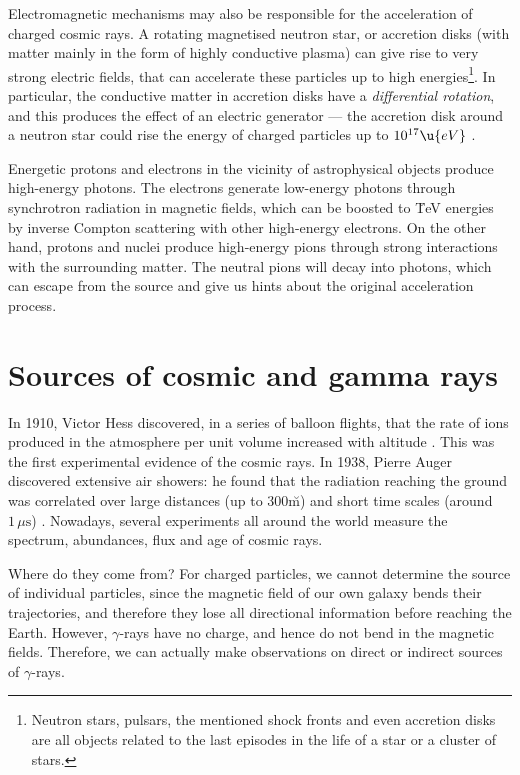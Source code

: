 Electromagnetic mechanisms may also be responsible for the
acceleration of charged cosmic rays.  A rotating magnetised neutron
star, or accretion disks (with matter mainly in the form of highly
conductive plasma) can give rise to very strong electric fields, that
can accelerate these particles up to high energies\footnote{Neutron
  stars, pulsars, the mentioned shock fronts and even accretion disks
  are all objects related to the last episodes in the life of a star
  or a cluster of stars.}.  In
particular, the conductive matter in accretion disks have a
\emph{differential rotation}, and this produces the effect of an
electric generator --- the accretion disk around a neutron star could
rise the energy of charged particles up to $10^{17}\u{eV}$ \cite{XXX}.

Energetic protons and electrons in the vicinity of astrophysical
objects produce high-energy photons.  The electrons generate low-energy
photons through synchrotron radiation in magnetic fields, which can be
boosted to \u{TeV} energies by inverse Compton scattering with other
high-energy electrons.  On the other hand, protons and nuclei produce
high-energy pions through strong interactions with the surrounding
matter. The neutral pions will decay into photons, which can escape
from the source and give us hints about the original acceleration
process.

\section{Sources of cosmic and gamma rays}
\label{sec:sources}

In 1910, Victor Hess discovered, in a series of balloon flights, that
the rate of ions produced in the atmosphere per unit volume increased
with altitude \cite{XXX}. This was the first experimental evidence of
the cosmic rays. In 1938, Pierre Auger discovered extensive air
showers: he found that the radiation reaching the ground was
correlated over large distances (up to 300\u{m}) and short time scales
(around $1\,\mu\text{s}$) \cite{XXX}.  Nowadays, several experiments all
around the world measure the spectrum, abundances, flux and age of
cosmic rays.

Where do they come from? For charged particles, we cannot determine
the source of individual particles, since the magnetic field of our
own galaxy bends their trajectories, and therefore they lose all
directional information before reaching the Earth.  However,
$\gamma$-rays have no charge, and hence do not bend in the magnetic
fields. Therefore, we can actually make observations on direct or
indirect sources of $\gamma$-rays.

